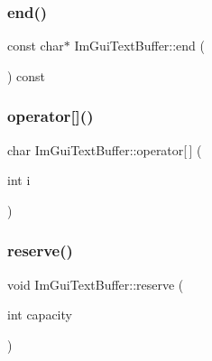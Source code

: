 \hypertarget{struct_im_gui_text_buffer_a2fc30ad0d384f98dfcea722f798d91f2}{}\label{struct_im_gui_text_buffer_a2fc30ad0d384f98dfcea722f798d91f2} 
\subsubsection{\texorpdfstring{end()}{end()}}
{\footnotesize\ttfamily const char$\ast$ Im\+Gui\+Text\+Buffer\+::end (\begin{DoxyParamCaption}{ }\end{DoxyParamCaption}) const}

\hypertarget{struct_im_gui_text_buffer_a8550f53463fd12711e3d08b740227bd4}{}\label{struct_im_gui_text_buffer_a8550f53463fd12711e3d08b740227bd4} 
\subsubsection{\texorpdfstring{operator[]()}{operator[]()}}
{\footnotesize\ttfamily char Im\+Gui\+Text\+Buffer\+::operator\mbox{[}$\,$\mbox{]} (\begin{DoxyParamCaption}\item[{int}]{i }\end{DoxyParamCaption})}

\hypertarget{struct_im_gui_text_buffer_a3271f361e0f1997f4c3eb77665fdf161}{}\label{struct_im_gui_text_buffer_a3271f361e0f1997f4c3eb77665fdf161} 
\subsubsection{\texorpdfstring{reserve()}{reserve()}}
{\footnotesize\ttfamily void Im\+Gui\+Text\+Buffer\+::reserve (\begin{DoxyParamCaption}\item[{int}]{capacity }\end{DoxyParamCaption})}

\hypertarget{struct_im_gui_text_buffer_a2811fcd43e0224eb3bd0f3464b634289}{}\label{struct_im_gui_text_buffer_a2811fcd43e0224eb3bd0f3464b634289} 
